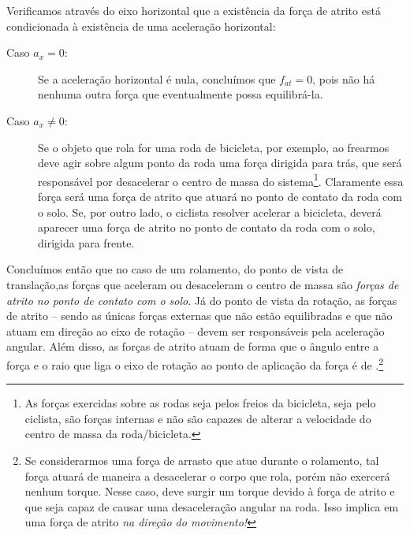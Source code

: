 \begin{marginfigure}[-3cm]
\caption{.}
\end{marginfigure}

Verificamos através do eixo horizontal que a existência da força de atrito está condicionada à existência de uma aceleração horizontal:
\begin{description}
    \item[Caso $a_x = 0$:] Se a aceleração horizontal é nula, concluímos que $f_{at} = 0$, pois não há nenhuma outra força que eventualmente possa equilibrá-la.
    \item[Caso $a_x \neq 0$:] Se o objeto que rola for uma roda de bicicleta, por exemplo, ao frearmos deve agir sobre algum ponto da roda uma força dirigida para trás, que será responsável por desacelerar o centro de massa do sistema\footnote{As forças exercidas sobre as rodas seja pelos freios da bicicleta, seja pelo ciclista, são forças internas e não são capazes de alterar a velocidade do centro de massa da roda/bicicleta.}. Claramente essa força será uma força de atrito que atuará no ponto de contato da roda com o solo. Se, por outro lado, o ciclista resolver acelerar a bicicleta, deverá aparecer uma força de atrito no ponto de contato da roda com o solo, dirigida para frente.
\end{description}

Concluímos então que no caso de um rolamento, do ponto de vista de translação,as forças que aceleram ou desaceleram o centro de massa são \emph{forças de atrito no ponto de contato com o solo}. Já do ponto de vista da rotação, as forças de atrito -- sendo as únicas forças externas que não estão equilibradas e que não atuam em direção ao eixo de rotação -- devem ser responsáveis pela aceleração angular. Além disso, as forças de atrito atuam de forma que o ângulo entre a força e o raio que liga o eixo de rotação ao ponto de aplicação da força é de .\footnote[][-2cm]{Se considerarmos uma força de arrasto que atue durante o rolamento, tal força atuará de maneira a desacelerar o corpo que rola, porém não exercerá nenhum torque. Nesse caso, deve surgir um torque devido à força de atrito e que seja capaz de causar uma desaceleração angular na roda. Isso implica em uma força de atrito \emph{na direção do movimento!}}

